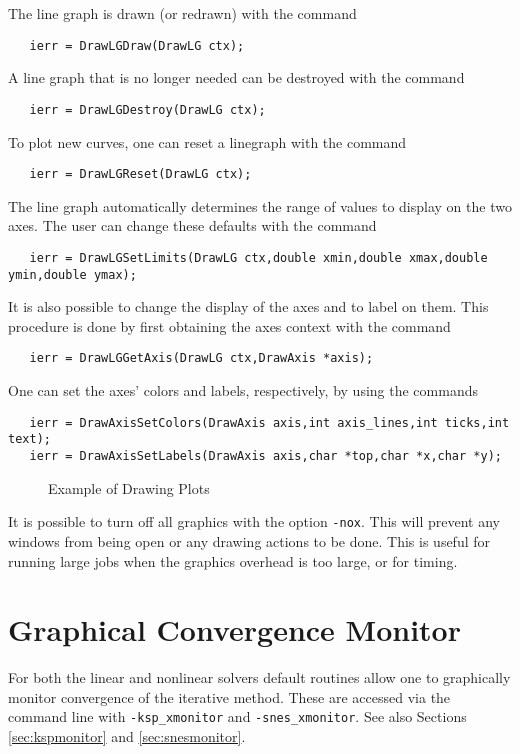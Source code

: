 The line graph is drawn (or redrawn) with the command 
\begin{verbatim}
   ierr = DrawLGDraw(DrawLG ctx);
\end{verbatim}
A line graph that is no longer needed can be destroyed with the 
command 
\begin{verbatim}
   ierr = DrawLGDestroy(DrawLG ctx);
\end{verbatim}
To plot new curves, one can reset a linegraph with the
command 
\begin{verbatim}
   ierr = DrawLGReset(DrawLG ctx);
\end{verbatim}
The line graph automatically determines the range of values to 
display on the two axes.  The user can change these defaults with the 
command 
\begin{verbatim}
   ierr = DrawLGSetLimits(DrawLG ctx,double xmin,double xmax,double ymin,double ymax);
\end{verbatim}

It is also possible to change the display of the axes and to label
on them. This procedure is done by first obtaining the axes context with the 
command  
\begin{verbatim}
   ierr = DrawLGGetAxis(DrawLG ctx,DrawAxis *axis);
\end{verbatim}
One can set the axes' colors and labels, respectively, by using the
commands  
\begin{verbatim}
   ierr = DrawAxisSetColors(DrawAxis axis,int axis_lines,int ticks,int text);
   ierr = DrawAxisSetLabels(DrawAxis axis,char *top,char *x,char *y);
\end{verbatim}

\begin{figure}[H]
{\small
{}
}
\caption{Example of Drawing Plots}
\label{fig:plot}
\end{figure}

It is possible to turn off all graphics with the option 
{\tt -nox}. This
will prevent any windows from being open or any drawing actions to be done.
This is useful for running large jobs when the graphics overhead is too
large, or for timing.

\section{Graphical Convergence Monitor}
For both the linear and nonlinear solvers default routines
allow one to graphically monitor convergence of the iterative method.
These are accessed via the command line with 
{\tt -ksp\_xmonitor} and {\tt -snes\_xmonitor}. 
 See also Sections \ref{sec:kspmonitor} and
\ref{sec:snesmonitor}. 

